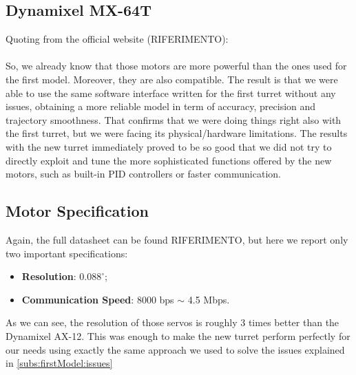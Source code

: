 \subsection{Dynamixel MX-64T}
Quoting from the official website (RIFERIMENTO):\\
\\
So, we already know that those motors are more powerful than the ones used for the first model. Moreover, they are also compatible. The result is that we were able to use the same software interface written for the first turret without any issues, obtaining a more reliable model in term of accuracy, precision and trajectory smoothness. That confirms that we were doing things right also with the first turret, but we were facing its physical/hardware limitations. The results with the new turret immediately proved to be so good that we did not try to directly exploit and tune the more sophisticated functions offered by the new motors, such as built-in PID controllers or faster communication.
\subsection{Motor Specification}
Again, the full datasheet can be found RIFERIMENTO, but here we report only two important specifications:
\begin{itemize}
    \item \textbf{Resolution}: $0.088^{\circ}$;
    \item \textbf{Communication Speed}: 8000 bps $\sim$ 4.5 Mbps.
\end{itemize}
As we can see, the resolution of those servos is roughly 3 times better than the Dynamixel AX-12. This was enough to make the new turret perform perfectly for our needs using exactly the same approach we used to solve the issues explained in \ref{subs:firstModel:issues}
